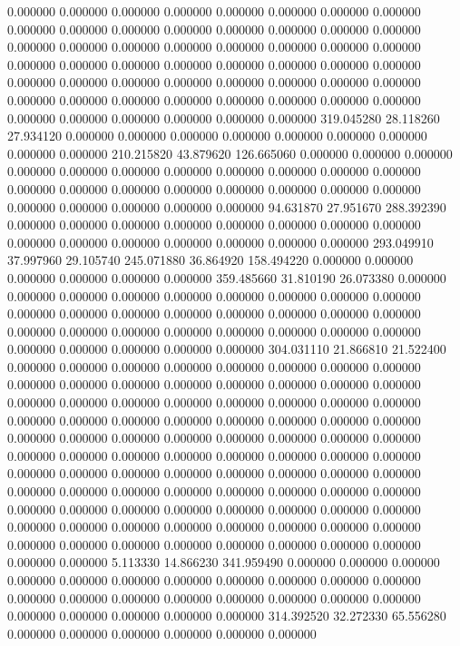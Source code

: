 0.000000 0.000000 0.000000
0.000000 0.000000 0.000000
0.000000 0.000000 0.000000
0.000000 0.000000 0.000000
0.000000 0.000000 0.000000
0.000000 0.000000 0.000000
0.000000 0.000000 0.000000
0.000000 0.000000 0.000000
0.000000 0.000000 0.000000
0.000000 0.000000 0.000000
0.000000 0.000000 0.000000
0.000000 0.000000 0.000000
0.000000 0.000000 0.000000
0.000000 0.000000 0.000000
0.000000 0.000000 0.000000
0.000000 0.000000 0.000000
0.000000 0.000000 0.000000
0.000000 0.000000 0.000000
319.045280 28.118260 27.934120
0.000000 0.000000 0.000000
0.000000 0.000000 0.000000
0.000000 0.000000 0.000000
210.215820 43.879620 126.665060
0.000000 0.000000 0.000000
0.000000 0.000000 0.000000
0.000000 0.000000 0.000000
0.000000 0.000000 0.000000
0.000000 0.000000 0.000000
0.000000 0.000000 0.000000
0.000000 0.000000 0.000000
0.000000 0.000000 0.000000
94.631870 27.951670 288.392390
0.000000 0.000000 0.000000
0.000000 0.000000 0.000000
0.000000 0.000000 0.000000
0.000000 0.000000 0.000000
0.000000 0.000000 0.000000
293.049910 37.997960 29.105740
245.071880 36.864920 158.494220
0.000000 0.000000 0.000000
0.000000 0.000000 0.000000
359.485660 31.810190 26.073380
0.000000 0.000000 0.000000
0.000000 0.000000 0.000000
0.000000 0.000000 0.000000
0.000000 0.000000 0.000000
0.000000 0.000000 0.000000
0.000000 0.000000 0.000000
0.000000 0.000000 0.000000
0.000000 0.000000 0.000000
0.000000 0.000000 0.000000
0.000000 0.000000 0.000000
304.031110 21.866810 21.522400
0.000000 0.000000 0.000000
0.000000 0.000000 0.000000
0.000000 0.000000 0.000000
0.000000 0.000000 0.000000
0.000000 0.000000 0.000000
0.000000 0.000000 0.000000
0.000000 0.000000 0.000000
0.000000 0.000000 0.000000
0.000000 0.000000 0.000000
0.000000 0.000000 0.000000
0.000000 0.000000 0.000000
0.000000 0.000000 0.000000
0.000000 0.000000 0.000000
0.000000 0.000000 0.000000
0.000000 0.000000 0.000000
0.000000 0.000000 0.000000
0.000000 0.000000 0.000000
0.000000 0.000000 0.000000
0.000000 0.000000 0.000000
0.000000 0.000000 0.000000
0.000000 0.000000 0.000000
0.000000 0.000000 0.000000
0.000000 0.000000 0.000000
0.000000 0.000000 0.000000
0.000000 0.000000 0.000000
0.000000 0.000000 0.000000
0.000000 0.000000 0.000000
0.000000 0.000000 0.000000
0.000000 0.000000 0.000000
0.000000 0.000000 0.000000
5.113330 14.866230 341.959490
0.000000 0.000000 0.000000
0.000000 0.000000 0.000000
0.000000 0.000000 0.000000
0.000000 0.000000 0.000000
0.000000 0.000000 0.000000
0.000000 0.000000 0.000000
0.000000 0.000000 0.000000
0.000000 0.000000 0.000000
314.392520 32.272330 65.556280
0.000000 0.000000 0.000000
0.000000 0.000000 0.000000

